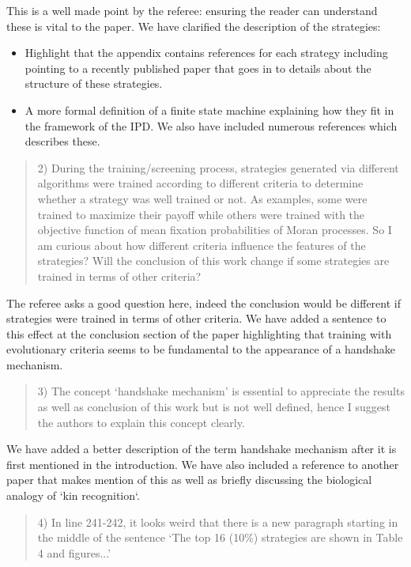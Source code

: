 \documentclass[a4]{article}
\begin{document}
This is a well made point by the referee: ensuring the reader can understand
these is vital to the paper.
We have clarified the description of the strategies:

\begin{itemize}
    \item Highlight that the appendix contains references for each strategy
        including pointing to a recently published paper that goes in to details
        about the structure of these strategies.
    \item A more formal definition of a finite state machine explaining how they
        fit in the framework of the IPD. We also have included numerous references
        which describes these.
\end{itemize}

\begin{quote}
  2) During the training/screening process, strategies generated via different
  algorithms were trained according to different criteria to determine whether a
  strategy was well trained or not. As examples, some were trained to maximize
  their payoff while others were trained with the objective function of mean
  fixation probabilities of Moran processes. So I am curious about how different
  criteria influence the features of the strategies? Will the conclusion of this
  work change if some strategies are trained in terms of other criteria?
\end{quote}

The referee asks a good question here, indeed the conclusion would be different
if strategies were trained in terms of other criteria. We have added a sentence
to this effect at the conclusion section of the paper highlighting that training
with evolutionary criteria seems to be fundamental to the appearance of a
handshake mechanism.

\begin{quote}
  3) The concept `handshake mechanism' is essential to appreciate the results as
  well as conclusion of this work but is not well defined, hence I suggest the
  authors to explain this concept clearly.
\end{quote}

We have added a better description of the term handshake mechanism after it is
first mentioned in the introduction. We have also included a reference to
another paper that makes mention of this as well as briefly discussing the
biological analogy of `kin recognition`.

\begin{quote}
  4) In line 241-242, it looks weird that there is a new paragraph starting in
  the middle of the sentence `The top 16 (10\%) strategies are shown in Table 4
  and figures...'
\end{quote}
\end{document}
